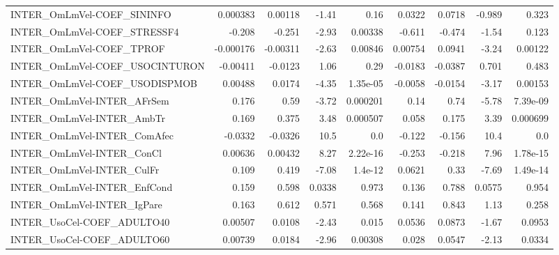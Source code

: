 \begin{tabular}{lrrrrrrrr}
INTER\_OmLmVel-COEF\_SININFO            &    0.000383 &      0.00118 &    -1.41 &     0.16 &     0.0322 &      0.0718 &       -0.989 &         0.323 \\
INTER\_OmLmVel-COEF\_STRESSF4           &      -0.208 &       -0.251 &    -2.93 &  0.00338 &     -0.611 &      -0.474 &        -1.54 &         0.123 \\
INTER\_OmLmVel-COEF\_TPROF              &   -0.000176 &     -0.00311 &    -2.63 &  0.00846 &    0.00754 &      0.0941 &        -3.24 &       0.00122 \\
INTER\_OmLmVel-COEF\_USOCINTURON        &    -0.00411 &      -0.0123 &     1.06 &     0.29 &    -0.0183 &     -0.0387 &        0.701 &         0.483 \\
INTER\_OmLmVel-COEF\_USODISPMOB         &     0.00488 &       0.0174 &    -4.35 & 1.35e-05 &    -0.0058 &     -0.0154 &        -3.17 &       0.00153 \\
INTER\_OmLmVel-INTER\_AFrSem            &       0.176 &         0.59 &    -3.72 & 0.000201 &       0.14 &        0.74 &        -5.78 &      7.39e-09 \\
INTER\_OmLmVel-INTER\_AmbTr             &       0.169 &        0.375 &     3.48 & 0.000507 &      0.058 &       0.175 &         3.39 &      0.000699 \\
INTER\_OmLmVel-INTER\_ComAfec           &     -0.0332 &      -0.0326 &     10.5 &      0.0 &     -0.122 &      -0.156 &         10.4 &           0.0 \\
INTER\_OmLmVel-INTER\_ConCl             &     0.00636 &      0.00432 &     8.27 & 2.22e-16 &     -0.253 &      -0.218 &         7.96 &      1.78e-15 \\
INTER\_OmLmVel-INTER\_CulFr             &       0.109 &        0.419 &    -7.08 &  1.4e-12 &     0.0621 &        0.33 &        -7.69 &      1.49e-14 \\
INTER\_OmLmVel-INTER\_EnfCond           &       0.159 &        0.598 &   0.0338 &    0.973 &      0.136 &       0.788 &       0.0575 &         0.954 \\
INTER\_OmLmVel-INTER\_IgPare            &       0.163 &        0.612 &    0.571 &    0.568 &      0.141 &       0.843 &         1.13 &         0.258 \\
INTER\_UsoCel-COEF\_ADULTO40            &     0.00507 &       0.0108 &    -2.43 &    0.015 &     0.0536 &      0.0873 &        -1.67 &        0.0953 \\
INTER\_UsoCel-COEF\_ADULTO60            &     0.00739 &       0.0184 &    -2.96 &  0.00308 &      0.028 &      0.0547 &        -2.13 &        0.0334 \\

\end{tabular}
